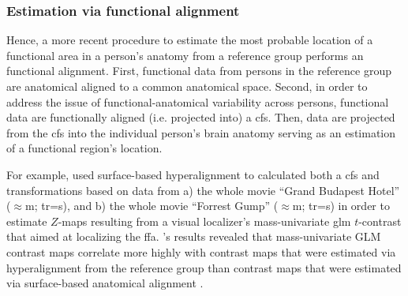\subsubsection{Estimation via functional alignment}





%
Hence, a more recent procedure \citep[e.g., ][]{jiahui2020predicting,
guntupalli2016model, haxby2011common} to estimate the most probable location of
a functional area in a person's anatomy from a reference group performs an
functional alignment.
First, functional data from persons in the reference group are anatomical
aligned to a common anatomical space.
%
Second, in order to address the issue of functional-anatomical variability
across persons, functional data are functionally aligned (i.e. projected into) a
\ac{cfs}.
%
Then, data are projected from the \ac{cfs} into the individual person's brain
anatomy serving as an estimation of a functional region's location.

For example, \citet{jiahui2020predicting} used surface-based hyperalignment to
calculated both a \ac{cfs} and transformations based on data from
%
a) the whole movie ``Grand Budapest Hotel'' ($\approx$\unit[50]{m};
\ac{tr}=\unit[1]{s}), and
%
b) the whole movie ``Forrest Gump'' ($\approx$\unit[120]{m};
\ac{tr}=\unit[2]{s})
%
in order to estimate $Z$-maps resulting from a visual localizer's
mass-univariate \ac{glm} $t$-contrast that aimed at localizing the \ac{ffa}.
\citet{jiahui2020predicting}'s results revealed that mass-univariate GLM
contrast maps correlate more highly with contrast maps that were estimated via
hyperalignment from the reference group than contrast maps that were estimated
via surface-based anatomical alignment \citep{jiahui2020predicting}.




